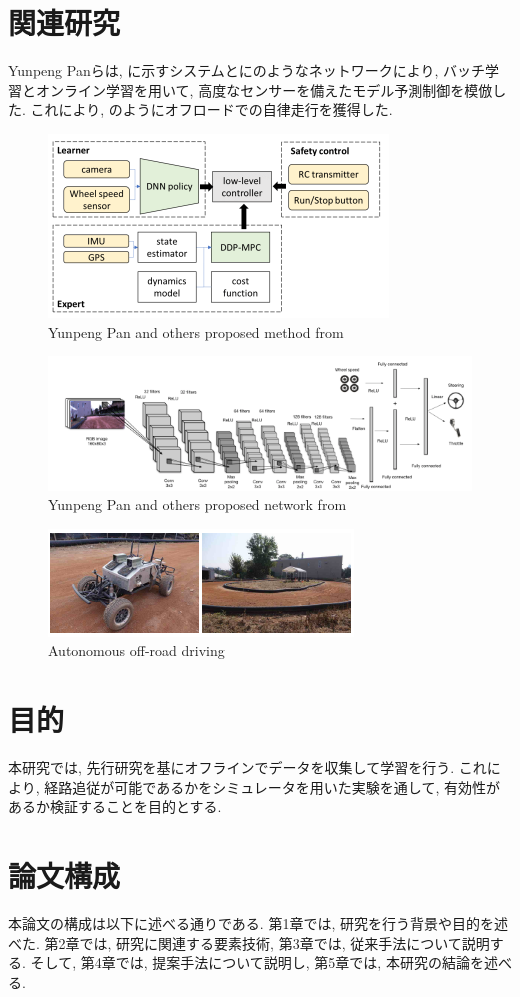 \newpage
\section{関連研究}
Yunpeng Pan\cite{batch}らは, に示すシステムとにのようなネットワークにより, バッチ学習とオンライン学習を用いて, 高度なセンサーを備えたモデル予測制御を模倣した. これにより, のようにオフロードでの自律走行を獲得した. 

\begin{figure}[h]
     \centering
     \includegraphics[keepaspectratio, scale=0.7]{images/batch1.png}
     \caption{Yunpeng Pan and others proposed method from \cite{batch}}
     \label{Fig:batch1}
     \end{figure}

\begin{figure}[h]
     \centering
     \includegraphics[keepaspectratio, scale=0.5]{images/net.png}
     \caption{Yunpeng Pan and others proposed network from \cite{net}}
     \label{Fig:net}
     \end{figure}

\begin{figure}[h]
     \centering
     \includegraphics[keepaspectratio, scale=0.7]{images/batch2.png}
     \caption{Autonomous off-road driving}
     \label{Fig:batch2}
     \end{figure}


\newpage
\section{目的}
本研究では, 先行研究を基にオフラインでデータを収集して学習を行う. これにより, 経路追従が可能であるかをシミュレータを用いた実験を通して, 有効性があるか検証することを目的とする. 

\section{論文構成}
本論文の構成は以下に述べる通りである. 第1章では, 研究を行う背景や目的を述べた. 第2章では, 研究に関連する要素技術, 第3章では, 従来手法について説明する. そして, 第4章では, 提案手法について説明し, 第5章では, 本研究の結論を述べる. 
     
